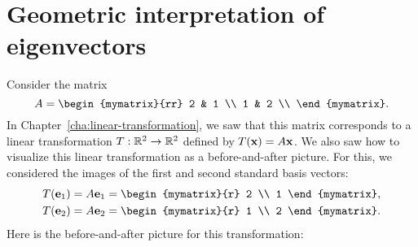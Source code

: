 \section{Geometric interpretation of eigenvectors}

Consider the matrix
\begin{equation*}
  A = \begin{mymatrix}{rr}
    2 & 1 \\
    1 & 2 \\
  \end{mymatrix}.
\end{equation*}
In Chapter~\ref{cha:linear-transformation}, we saw that this matrix
corresponds to a linear transformation $T : \mathbb{R}^2\to\mathbb{R}^2$ defined by
$T(\mbox{\bf x}) = A\mbox{\bf x}$. We also saw how to visualize this linear
transformation as a before-and-after picture. For this, we
considered the images of the first and second standard basis vectors:
\begin{align*}
  T(\vect{e}_1) &= A\vect{e}_1 = \begin{mymatrix}{r} 2 \\ 1 \end{mymatrix},\\
  T(\vect{e}_2) &= A\vect{e}_2 = \begin{mymatrix}{r} 1 \\ 2 \end{mymatrix}.
\end{align*}
Here is the before-and-after picture for this transformation:
\vspace{-2cm}
